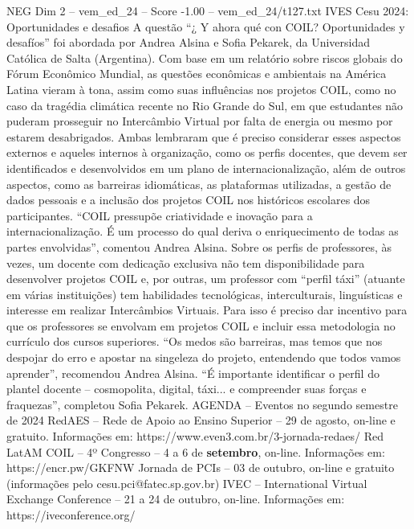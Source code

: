 \begin{textsample}{NEG Dim 2 – vem\_ed\_24 – Score -1.00 – vem\_ed\_24/t127.txt}  \label{ex:f2_neg_022}
IVES Cesu 2024: Oportunidades e desafios A questão “¿ Y ahora qué con COIL?
Oportunidades y desafíos” foi abordada por Andrea Alsina e Sofia Pekarek, da Universidad Católica de Salta (Argentina).
Com base em um relatório sobre riscos globais do Fórum Econômico Mundial, as questões econômicas e ambientais na América Latina vieram à tona, assim como suas influências nos projetos COIL, como no caso da tragédia climática recente no Rio Grande do Sul, em que estudantes não puderam prosseguir no Intercâmbio Virtual por falta de energia ou mesmo por estarem desabrigados.
Ambas lembraram que é preciso considerar esses aspectos externos e aqueles internos à organização, como os perfis docentes, que devem ser identificados e desenvolvidos em um plano de internacionalização, além de outros aspectos, como as barreiras idiomáticas, as plataformas utilizadas, a gestão de dados pessoais e a inclusão dos projetos COIL nos históricos escolares dos participantes. “COIL pressupõe criatividade e inovação para a internacionalização.
É um processo do qual deriva o enriquecimento de todas as partes envolvidas”, comentou Andrea Alsina.
Sobre os perfis de professores, às vezes, um docente com dedicação exclusiva não tem disponibilidade para desenvolver projetos COIL e, por outras, um professor com “perfil táxi” (atuante em várias instituições) tem habilidades tecnológicas, interculturais, linguísticas e interesse em realizar Intercâmbios Virtuais.
Para isso é preciso dar incentivo para que os professores se envolvam em projetos COIL e incluir essa metodologia no currículo dos cursos superiores. “Os medos são barreiras, mas temos que nos despojar do erro e apostar na singeleza do projeto, entendendo que todos vamos aprender”, recomendou Andrea Alsina. “É importante identificar o perfil do plantel docente – cosmopolita, digital, táxi... e compreender suas forças e fraquezas”, completou Sofia Pekarek.
AGENDA – Eventos no segundo semestre de 2024 RedAES – Rede de Apoio ao Ensino Superior – 29 de agosto, on-line e gratuito.
Informações em: https://www.even3.com.br/3-jornada-redaes/ Red LatAM COIL – 4º Congresso – 4 a 6 de \textbf{setembro}, on-line.
Informações em: https://encr.pw/GKFNW Jornada de PCIs – 03 de outubro, on-line e gratuito (informações pelo cesu.pci@fatec.sp.gov.br) IVEC – International Virtual Exchange Conference – 21 a 24 de outubro, on-line.
Informações em: https://iveconference.org/

\end{textsample}
